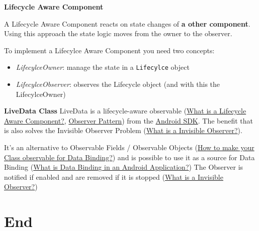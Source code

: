 \documentclass[11pt,twoside,landscape]{article}
\begin{document}
\begin{multicols}{3}
\textbf{Lifecycle Aware Component}

A Lifecycle Aware Component reacts on state changes of \textbf{a other component}.
Using this approach the state logic moves from the owner to the observer.

To implement a Lifecylce Aware Component you need two concepts:
\begin{itemize}
\item \emph{LifecylceOwner}: manage the state in a \texttt{Lifecylce} object
\item \emph{LifecylceObserver}: observes the Lifecycle object (and with this the LifecylceOwner)
\end{itemize}


\textbf{LiveData Class}
LiveData is a lifecycle-aware observable (\href{../../../roam/20211112114814-what_is_a_lifecycle_aware_component.org}{What is a Lifecycle Aware Component?}, \href{../../../roam/20211103140808-observer_pattern.org}{Observer Pattern}) from the \href{../../../roam/20210928175951-android_sdk.org}{Android SDK}.
The benefit that is also solves the Invisible Observer Problem (\href{../../../roam/20211112110032-what_is_a_invisible_observer.org}{What is a Invisible Observer?}).

It's an alternative to Observable Fields / Observable Objects (\href{../../../roam/20211112103257-how_to_make_your_class_observable_for_data_binding.org}{How to make your Class observable for Data Binding?}) and is possible to use it as a source for Data Binding (\href{../../../roam/20211112100504-what_is_data_binding_in_an_android_application.org}{What is Data Binding in an Android Application?})
The Observer is notified if enabled and are removed if it is stopped (\href{../../../roam/20211112110032-what_is_a_invisible_observer.org}{What is a Invisible Observer?})

\section{End}
\label{sec:org2a409cc}
\end{multicols}
\end{document}
